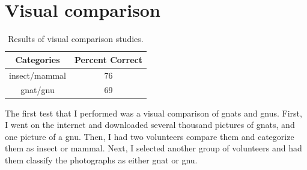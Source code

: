\documentclass[12pt]{thesis}
\begin{document}
\section{Visual comparison}

\begin{table}
\caption{Results of visual comparison studies.}
\begin{center}
  \begin{tabular}{|c|c|}
    \hline
    \bf Categories & \bf Percent Correct\\
    \hline
    \hline
    insect/mammal & 76\\
    \hline
    gnat/gnu & 69\\
    \hline
  \end{tabular}
\end{center}
\label{table:comp1}
\end{table}

The first test that I performed was a visual comparison of gnats and
gnus.  First, I went on the internet and downloaded several thousand
pictures of gnats, and one picture of a gnu.  Then, I had two
volunteers compare them and categorize them as insect
or mammal.
Next, I selected another group of volunteers and
had them classify the photographs as either gnat or gnu.
\end{document}
